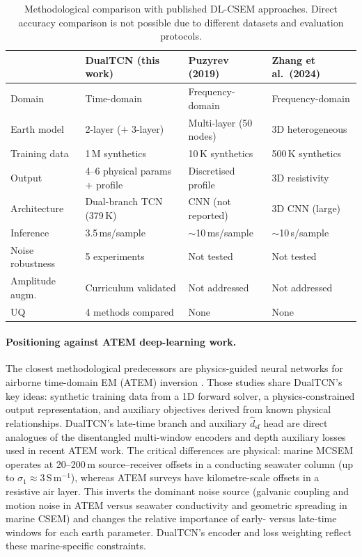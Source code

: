\documentclass[journal]{IEEEtran}
\begin{document}
\begin{table}[t]
  \centering
  \caption{Methodological comparison with published DL-CSEM
  approaches.  Direct accuracy comparison is not possible due to
  different datasets and evaluation protocols.}
  \label{tab:dl_comparison}
  \small
  \setlength{\tabcolsep}{3pt}
  \begin{tabular}{p{2.5cm}p{4.0cm}p{3.5cm}p{4.0cm}}
    \toprule
    & \textbf{DualTCN} (this work)
    & \textbf{Puzyrev (2019)}
    & \textbf{Zhang et al.\ (2024)} \\
    \midrule
    Domain
      & Time-domain
      & Frequency-domain
      & Frequency-domain \\
    Earth model
      & 2-layer ($+$ 3-layer)
      & Multi-layer (50 nodes)
      & 3D heterogeneous \\
    Training data
      & 1\,M synthetics
      & 10\,K synthetics
      & 500\,K synthetics \\
    Output
      & 4--6 physical params $+$ profile
      & Discretised profile
      & 3D resistivity \\
    Architecture
      & Dual-branch TCN (379\,K)
      & CNN (not reported)
      & 3D CNN (large) \\
    Inference
      & 3.5\,ms/sample
      & $\sim$10\,ms/sample
      & $\sim$10\,s/sample \\
    Noise robustness
      & 5 experiments
      & Not tested
      & Not tested \\
    Amplitude augm.
      & Curriculum validated
      & Not addressed
      & Not addressed \\
    UQ
      & 4 methods compared
      & None
      & None \\
    \bottomrule
  \end{tabular}
\end{table}

\paragraph{Positioning against ATEM deep-learning work.}
The closest methodological predecessors are physics-guided neural
networks for airborne time-domain EM (ATEM) inversion
\citep{moghadas2020deep, liu2021atem, colombo2021deep}.  Those
studies share DualTCN's key ideas: synthetic training data from a
1D forward solver, a physics-constrained output representation, and
auxiliary objectives derived from known physical relationships.
DualTCN's late-time branch and auxiliary $\hat{d}_\mathrm{sf}$ head
are direct analogues of the disentangled multi-window encoders and
depth auxiliary losses used in recent ATEM work.  The critical
differences are physical: marine MCSEM operates at 20--200\,m
source--receiver offsets in a conducting seawater column (up to
$\sigma_1 \approx 3$\,S\,m$^{-1}$), whereas ATEM surveys have
kilometre-scale offsets in a resistive air layer.  This inverts the
dominant noise source (galvanic coupling and motion noise in ATEM
versus seawater conductivity and geometric spreading in marine CSEM)
and changes the relative importance of early- versus late-time
windows for each earth parameter.  DualTCN's encoder and loss
weighting reflect these marine-specific constraints.
\end{document}
